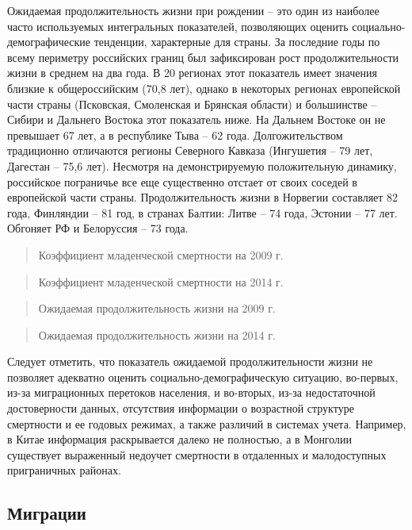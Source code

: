 \documentclass[]{book}
\begin{document}
Ожидаемая продолжительность жизни при рождении -- это один из наиболее
часто используемых интегральных показателей, позволяющих оценить
социально-демографические тенденции, характерные для страны. За
последние годы по всему периметру российских границ был зафиксирован
рост продолжительности жизни в среднем на два года. В 20 регионах этот
показатель имеет значения близкие к общероссийским (70,8 лет), однако в
некоторых регионах европейской части страны (Псковская, Смоленская и
Брянская области) и большинстве -- Сибири и Дальнего Востока этот
показатель ниже. На Дальнем Востоке он не превышает 67 лет, а в
республике Тыва -- 62 года. Долгожительством традиционно отличаются
регионы Северного Кавказа (Ингушетия -- 79 лет, Дагестан -- 75,6 лет).
Несмотря на демонстрируемую положительную динамику, российское
пограничье все еще существенно отстает от своих соседей в европейской
части страны. Продолжительность жизни в Норвегии составляет 82 года,
Финляндии -- 81 год, в странах Балтии: Литве -- 74 года, Эстонии -- 77
лет. Обгоняет РФ и Белоруссия -- 73 года.

\begin{quote}
Коэффициент младенческой смертности на 2009 г.
\end{quote}

\begin{quote}
Коэффициент младенческой смертности на 2014 г.
\end{quote}

\begin{quote}
Ожидаемая продолжительность жизни на 2009 г.
\end{quote}

\begin{quote}
Ожидаемая продолжительность жизни на 2014 г.
\end{quote}

Следует отметить, что показатель ожидаемой продолжительности жизни не
позволяет адекватно оценить социально-демографическую ситуацию,
во-первых, из-за миграционных перетоков населения, и во-вторых, из-за
недостаточной достоверности данных, отсутствия информации о возрастной
структуре смертности и ее годовых режимах, а также различий в системах
учета. Например, в Китае информация раскрывается далеко не полностью, а
в Монголии существует выраженный недоучет смертности в отдаленных и
малодоступных приграничных районах.

\hypertarget{demo-situ-mig}{%
\subsection{Миграции}\label{demo-situ-mig}}
\end{document}
